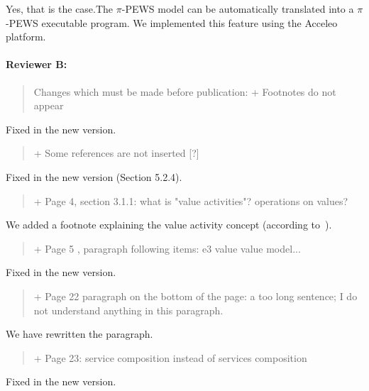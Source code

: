 \documentclass[12pt,a4wide]{article}
\begin{document}
 
Yes, that is the case.The $\pi$-PEWS model can be automatically translated into a $\pi$-PEWS executable program. We implemented this feature using the Acceleo platform.
 
\paragraph*{Reviewer B:} 
\begin{quotation}\sf\footnotesize

Changes which must be made before publication: 
+ Footnotes do not appear 
\end{quotation}

\noindent 
Fixed in the new version.


\begin{quotation}\sf\footnotesize

+ Some references are not inserted [?] 
\end{quotation}

\noindent 
Fixed in the new version (Section 5.2.4).

\begin{quotation}\sf\footnotesize

+ Page 4, section 3.1.1: what is "value activities"? operations on values? 
\end{quotation}

\noindent 
We added a footnote explaining the value activity concept (according to~\cite{Gordijn02valuebased}).

\begin{quotation}\sf\footnotesize

+ Page 5 , paragraph following items: e3 value value model... 
\end{quotation}

\noindent 
Fixed in the new version.

\begin{quotation}\sf\footnotesize

+ Page 22 paragraph on the bottom of the page: a too long sentence; I do not understand anything in this paragraph. 
\end{quotation}

\noindent 
We have rewritten the paragraph.

\begin{quotation}\sf\footnotesize

+ Page 23: service composition instead of services composition 
\end{quotation}

\noindent 
Fixed in the new version.
\end{document}
